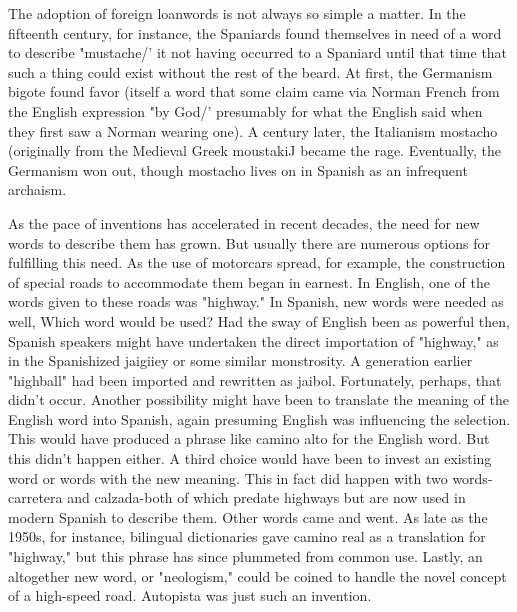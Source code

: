 \documentclass[14pt,a4paper,oneside]{memoir}
\begin{document}
{{{{The adoption of foreign loanwords is not always so simple
a matter. In the fifteenth century, for instance, the Spaniards found
themselves in need of a word to describe "mustache/' it not having occurred to a Spaniard until that time that such a thing could exist without the rest of the beard. At first, the Germanism bigote found favor
(itself a word that some claim came via Norman French from the English expression "by God/' presumably for what the English said when
they first saw a Norman wearing one). A century later, the Italianism
mostacho (originally from the Medieval Greek moustakiJ became the
rage. Eventually, the Germanism won out, though mostacho lives on
in Spanish as an infrequent archaism.

As the pace of inventions has accelerated in recent decades,
the need for new words to describe them has grown. But usually there
are numerous options for fulfilling this need. As the use of motorcars
spread, for example, the construction of special roads to accommodate
them began in earnest. In English, one of the words given to these roads
was "highway." In Spanish, new words were needed as well, Which
word would be used? Had the sway of English been as powerful then,
Spanish speakers might have undertaken the direct importation of
"highway," as in the Spanishized jaigiiey or some similar monstrosity. A generation earlier "highball" had been imported and rewritten
as jaibol. Fortunately, perhaps, that didn't occur. Another possibility
might have been to translate the meaning of the English word into
Spanish, again presuming English was influencing the selection. This
would have produced a phrase like camino alto for the English word.
But this didn't happen either. A third choice would have been to invest
an existing word or words with the new meaning. This in fact did happen with two words-carretera and calzada-both of which predate
highways but are now used in modern Spanish to describe them. Other
words came and went. As late as the 1950s, for instance, bilingual
dictionaries gave camino real as a translation for "highway," but this
phrase has since plummeted from common use. Lastly, an altogether
new word, or "neologism," could be coined to handle the novel concept of a high-speed road. Autopista was just such an invention.

}}}}
\end{document}
